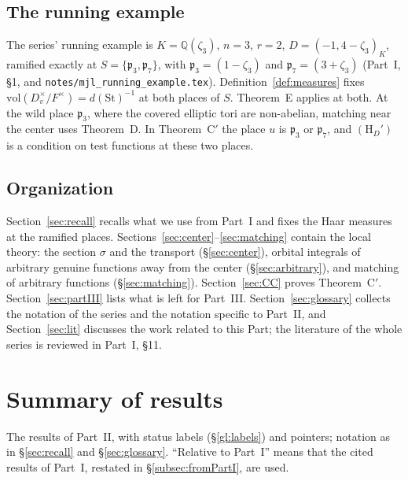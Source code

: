 \documentclass[12pt]{article}
\newcommand{\St}{\mathrm{St}}
\newcommand{\sg}{\sigma}
\theoremstyle{plain}
\theoremstyle{definition}
\begin{document}
\subsection*{The running example}
The series' running example is $K=\mathbb{Q}(\zeta_3)$, $n=3$, $r=2$, $D=(-1,4-\zeta_3)_K$, ramified exactly at $S=\{\mathfrak p_3,\mathfrak p_7\}$, with $\mathfrak p_3=(1-\zeta_3)$ and $\mathfrak p_7=(3+\zeta_3)$ (Part~I, \S1, and \texttt{notes/mjl\_running\_example.tex}). Definition~\ref{def:measures} fixes $\mathrm{vol}(D_v^\times/F^\times)=d(\St)^{-1}$ at both places of $S$. Theorem~E applies at both. At the wild place $\mathfrak p_3$, where the covered elliptic tori are non-abelian, matching near the center uses Theorem~D. In Theorem~C$'$ the place $u$ is $\mathfrak p_3$ or $\mathfrak p_7$, and $(\mathrm H_D')$ is a condition on test functions at these two places.

\subsection{Organization}
Section~\ref{sec:recall} recalls what we use from Part~I and fixes the Haar measures at the ramified places. Sections~\ref{sec:center}--\ref{sec:matching} contain the local theory: the section $\sg$ and the transport (\S\ref{sec:center}), orbital integrals of arbitrary genuine functions away from the center (\S\ref{sec:arbitrary}), and matching of arbitrary functions (\S\ref{sec:matching}). Section~\ref{sec:CC} proves Theorem~C$'$. Section~\ref{sec:partIII} lists what is left for Part~III. Section~\ref{sec:glossary} collects the notation of the series and the notation specific to Part~II, and Section~\ref{sec:lit} discusses the work related to this Part; the literature of the whole series is reviewed in Part~I, \S11.

\section*{Summary of results}\label{sec:summary}
The results of Part~II, with status labels (\S\ref{gl:labels}) and pointers; notation as in \S\ref{sec:recall} and \S\ref{sec:glossary}. ``Relative to Part~I'' means that the cited results of Part~I, restated in \S\ref{subsec:fromPartI}, are used.
\end{document}
